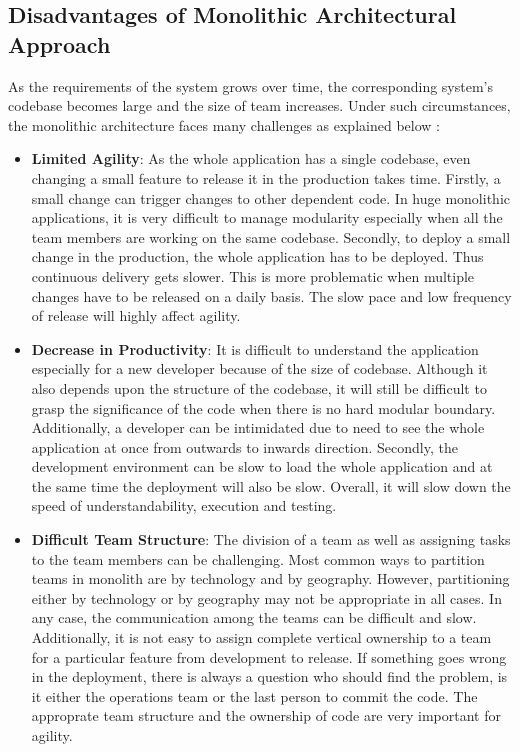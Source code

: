 \begin{enumerate}
\subsection{Disadvantages of Monolithic Architectural Approach}\label{subsection:context/monolith-disadvantages}
As the requirements of the system grows over time, the corresponding system's codebase becomes large and the size of team increases. Under such circumstances, the monolithic architecture faces many challenges as explained below \cite{Namiot:2014aa} \cite{Newman:2015aa}\cite{Abram:2014aa} \cite{Richardson:2014aa} \cite{Richardson:2014ab} \cite{Gupta:2015aa} :
\begin{itemize}[leftmargin=.5in]
\item \textbf{Limited Agility}: As the whole application has a single codebase, even changing a small feature to release it in the production takes time. Firstly, a small change can trigger changes to other dependent code. In huge monolithic applications, it is very difficult to manage modularity especially when all the team members are working on the same codebase. Secondly, to deploy a small change in the production, the whole application has to be deployed. Thus continuous delivery gets slower. This is more problematic when multiple changes have to be released on a daily basis. The slow pace and low frequency of release will highly affect agility.
\\
\item \textbf{Decrease in Productivity}: It is difficult to understand the application especially for a new developer because of the size of codebase. Although it also depends upon the structure of the codebase, it will still be difficult to grasp the significance of the code when there is no hard modular boundary. Additionally, a developer can be intimidated due to need to see the whole application at once from outwards to inwards direction. Secondly, the development environment can be slow to load the whole application and at the same time the deployment will also be slow. Overall, it will slow down the speed of understandability, execution and testing.
\\
\item \textbf{Difficult Team Structure}: The division of a team as well as assigning tasks to the team members can be challenging. Most common ways to partition teams in monolith are by technology and by geography. However, partitioning either by technology or by geography may not be appropriate in all cases. In any case, the communication among the teams can be difficult and slow. Additionally, it is not easy to assign complete vertical ownership to a team for a particular feature from development to release. If something goes wrong in the deployment, there is always a question who should find the problem, is it either the operations team or the last person to commit the code. The approprate team structure and the ownership of code are very important for agility.

\end{itemize}
\end{enumerate}
